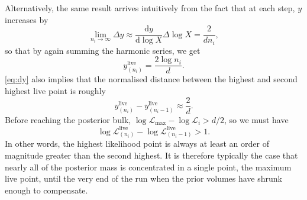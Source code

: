 \documentclass[usenatbib]{mnras}
\newcommand{\nlive}{n_i}
\newcommand{\Like}{\mathcal{L}}
\newcommand{\logLmax}{\log \Like_\mathrm{max}}
\begin{document}
\par
Alternatively, the same result arrives intuitively from the fact that at each step, $y$ increases by  
\begin{equation}\label{eq:dy}
    \lim_{\nlive \to \infty}\Delta y \approx \frac{\mathrm{d} y}{\mathrm{d}\log X} \Delta \log X = \frac{2}{d \nlive}, 
\end{equation}
so that by again summing the harmonic series, we get
\begin{equation}
    y_{(\nlive)}^{\mathrm{live}} = \frac{2\log \nlive}{d}.
\end{equation}
\cref{eq:dy} also implies that the normalised distance between the highest and second highest live point is roughly 
\begin{equation}
    y_{(\nlive)}^{\mathrm{live}} - y_{(\nlive - 1)}^{\mathrm{live}} \approx \frac{2}{d}.
\end{equation}
Before reaching the posterior bulk, $\logLmax - \log\Like_i > d/2$, so we must have
\begin{equation}
    \log \Like^{\mathrm{live}}_{(\nlive)} - \log \Like^\mathrm{live}_{(\nlive - 1)} > 1.
\end{equation}
In other words, the highest likelihood point is always at least an order of magnitude greater than the second highest. It is therefore typically the case that nearly all of the posterior mass is concentrated in a single point, the maximum live point, until the very end of the run when the prior volumes have shrunk enough to compensate.
\end{document}
